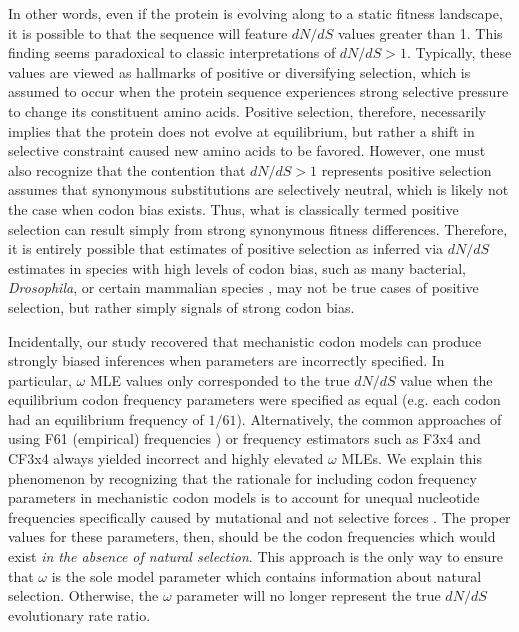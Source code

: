\documentclass[11pt]{article}
\begin{document}
In other words, even if the protein is evolving along to a static fitness landscape, it is possible to that the sequence will feature $dN/dS$ values greater than 1. This finding seems paradoxical to classic interpretations of $dN/dS >1$. Typically, these values are viewed as hallmarks of positive or diversifying selection, which is assumed to occur when the protein sequence experiences strong selective pressure to change its constituent amino acids. Positive selection, therefore, necessarily implies that the protein does not evolve at equilibrium, but rather a shift in selective constraint caused new amino acids to be favored. However, one must also recognize that the contention that $dN/dS > 1$ represents positive selection assumes that synonymous substitutions are selectively neutral, which is likely not the case when codon bias exists. Thus, what is classically termed positive selection can result simply from strong synonymous fitness differences. Therefore, it is entirely possible that estimates of positive selection as inferred via $dN/dS$ estimates in species with high levels of codon bias, such as many bacterial, \textit{Drosophila}, or certain mammalian species \cite{Duret2002, Chamaryetal2006, HershbergPetrov2008, PlotkinKudla2010}, may not be true cases of positive selection, but rather simply signals of strong codon bias.


Incidentally, our study recovered that mechanistic codon models can produce strongly biased inferences when parameters are incorrectly specified. In particular, $\omega$ MLE values only corresponded to the true $dN/dS$ value when the equilibrium codon frequency parameters were specified as equal (e.g. each codon had an equilibrium frequency of $1/61$). Alternatively, the common approaches of using F61 (empirical) frequencies \cite{GoldmanYang1994}) or frequency estimators such as F3x4 \cite{MuseGaut1994} and CF3x4 \cite{Pond2010} always yielded incorrect and highly elevated $\omega$ MLEs. We explain this phenomenon by recognizing that the rationale for including codon frequency parameters in mechanistic codon  models is to account for unequal nucleotide frequencies specifically caused by mutational and not selective forces \cite{YN00, Yang2006}. The proper values for these parameters, then, should be the codon frequencies which would exist \textit{in the absence of natural selection}. This approach is the only way to ensure that $\omega$ is the sole model parameter which contains information about natural selection. Otherwise, the $\omega$ parameter will no longer represent the true $dN/dS$ evolutionary rate ratio.
\end{document}
